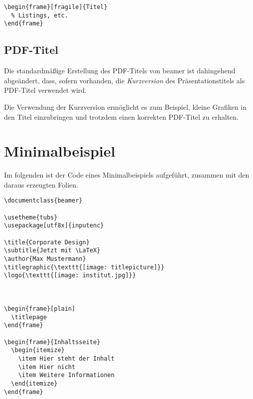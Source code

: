 \begin{lstlisting}[morekeywords={fragile},keywordstyle=\color{tuOrange}]
\begin{frame}[fragile]{Titel}
  % Listings, etc.
\end{frame}
\end{lstlisting}



\subsection{PDF-Titel}

Die standardmäßige Erstellung des PDF-Titels von beamer ist dahingehend
abgeändert, dass, sofern vorhanden, die \emph{Kurzversion} des Präsentationstitels
als PDF-Titel verwendet wird.

Die Verwendung der Kurzversion ermöglicht es zum Beispiel,
kleine Grafiken in den Titel einzubringen und
trotzdem einen korrekten PDF-Titel zu erhalten.


\section{Minimalbeispiel}%

Im folgenden ist der Code eines Minimalbeispiels aufgeführt, zusammen mit den
daraus erzeugten Folien.

\begin{verbatim}
\documentclass{beamer}

\usetheme{tubs}
\usepackage[utf8x]{inputenc}

\title{Corporate Design}
\subtitle{Jetzt mit \LaTeX}
\author{Max Mustermann}
\titlegraphic{\texttt{[image: titlepicture]}}
\logo{\texttt{[image: institut.jpg]}}



\begin{frame}[plain]
  \titlepage
\end{frame}

\begin{frame}{Inhaltsseite}
  \begin{itemize}
    \item Hier steht der Inhalt
    \item Hier nicht
    \item Weitere Informationen
  \end{itemize}
\end{frame}


\end{verbatim}

\begin{center}%

\end{center}
